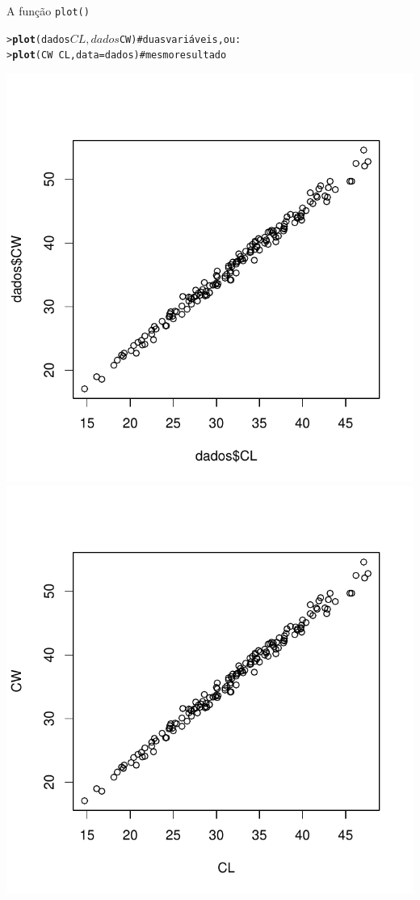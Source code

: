 \documentclass[10pt]{beamer}\usepackage{graphicx, color}
\makeatletter
\newcommand{\hlfunctioncall}[1]{\textcolor[rgb]{0,0,0.545098039215686}{\textbf{#1}}}%
\newcommand{\hlcomment}[1]{\textcolor[rgb]{0.2,0.2,0.2}{#1}}%
\newenvironment{kframe}{%
 \def\at@end@of@kframe{}%
 \ifinner\ifhmode%
  \def\at@end@of@kframe{\end{minipage}}%
  \begin{minipage}{\columnwidth}%
 \fi\fi%
 \def\FrameCommand##1{\hskip\@totalleftmargin \hskip-\fboxsep
 \colorbox{shadecolor}{##1}\hskip-\fboxsep
     \hskip-\linewidth \hskip-\@totalleftmargin \hskip\columnwidth}%
 \MakeFramed {\advance\hsize-\width
   \@totalleftmargin\z@ \linewidth\hsize
   \@setminipage}}%
 {\par\unskip\endMakeFramed%
 \at@end@of@kframe}
\newenvironment{knitrout}{}{} %
\makeatother
\begin{document}
\begin{frame}[fragile=singleslide]{A função \texttt{plot()}}
\begin{knitrout}\small
{}\color{fgcolor}\begin{kframe}
\begin{alltt}
> \hlfunctioncall{plot}(dados$CL, dados$CW)    \hlcomment{# duas variáveis, ou:}
> \hlfunctioncall{plot}(CW ~ CL, data = dados) \hlcomment{# mesmo resultado}
\end{alltt}
\end{kframe}

{\centering \includegraphics[width=.49\textwidth]{figure/unnamed-chunk-271} \includegraphics[width=.49\textwidth]{figure/unnamed-chunk-272} 

}


\end{knitrout}

\end{frame}
\end{document}
